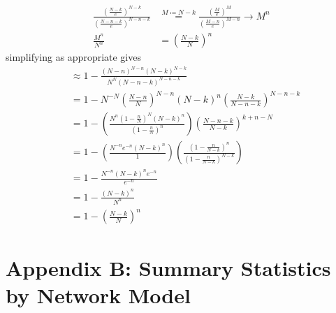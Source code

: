 \documentclass{article}
\theoremstyle{definition}
\begin{document}
\begin{align}
    \frac{\left(\frac{N-k}{e}\right)^{N-k}}{\left(\frac{N-n-k}{e}\right)^{N-n-k}}&\stackrel{M\coloneqq N-k}{=}\frac{\left(\frac{M}{e}\right)^{M}}{\left(\frac{M-n}{e}\right)^{M-n}}\to M^{n}\\
    \frac{M^{n}}{N^{n}}&=\left(\frac{N-k}{N}\right)^{n}
\end{align}
simplifying as appropriate gives
\begin{align}
    & \approx 1- \frac{\left(N-n\right)^{N-n}\left(N-k\right)^{N-k}}{N^{N}\left(N-n-k\right)^{N-n-k}}\\
    &= 1- N^{-N}\left(\frac{N-n}{N}\right)^{N-n}\left(N-k\right)^{n}\left(\frac{N-k}{N-n-k}\right)^{N-n-k}\\
    &=1-\left(\frac{N^{n}\left(1-\frac{n}{N}\right)^{N}\left(N-k\right)^{n}}{\left(1-\frac{n}{N}\right)^{n}}\right)\left(\frac{N-n-k}{N-k}\right)^{k+n-N}\\
    &=1-\left(\frac{N^{-n}e^{-n}\left(N-k\right)^{n}}{1}\right)\left(\frac{\left(1-\frac{n}{N-k}\right)^{n}}{\left(1-\frac{n}{N-k}\right)^{N-k}}\right)\\
    &=1-\frac{N^{-n}\left(N-k\right)^{n}e^{-n}}{e^{-n}}\\
    &=1-\frac{\left(N-k\right)^{n}}{N^{n}}\\
    &=1-\left(\frac{N-k}{N}\right)^{n}
\end{align}
\section{Appendix B: Summary Statistics by Network Model}
\end{document}
